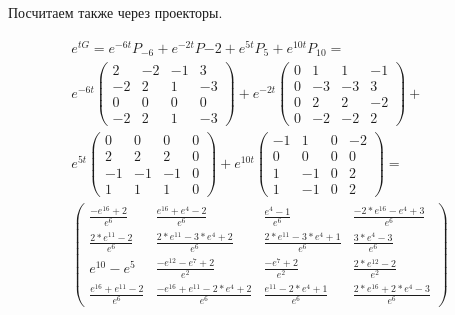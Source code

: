 \documentclass[12pt, a4paper]{article}
\begin{document}
    Посчитаем также через проекторы.

    \begin{multline}
        e^{t G} = e^{-6t} P_{-6} + e^{-2t} P{-2} + e^{5t} P_{5} + e^{10t} P_{10} = \\
        e^{-6t} \left(\begin{matrix}
            2 & -2 & -1 & 3 \\
            -2 & 2 & 1 & -3 \\
            0 & 0 & 0 & 0 \\
            -2 & 2 & 1 & -3
        \end{matrix}\right) + e^{-2t} \left(\begin{matrix}
            0 & 1 & 1 & -1 \\
            0 & -3 & -3 & 3 \\
            0 & 2 & 2 & -2 \\
            0 & -2 & -2 & 2
        \end{matrix}\right) + \\
         e^{5t} \left(\begin{matrix}
            0 & 0 & 0 & 0 \\
            2 & 2 & 2 & 0 \\
            -1 & -1 & -1 & 0 \\
            1 & 1 & 1 & 0
        \end{matrix}\right) + e^{10t} \left(\begin{matrix}
            -1 & 1 & 0 & -2 \\
            0 & 0 & 0 & 0 \\
            1 & -1 & 0 & 2 \\
            1 & -1 & 0 & 2
        \end{matrix}\right) = \\ \left(\begin{matrix}
            \frac{-e^{16}+2}{e^6} & \frac{e^{16}+e^4-2}{e^6} & \frac{e^4-1}{e^6} & \frac{-2*e^{16}-e^4+3}{e^6} \\
            \frac{2*e^{11}-2}{e^6} & \frac{2*e^{11}-3*e^4+2}{e^6} & \frac{2*e^{11}-3*e^4+1}{e^6} & \frac{3*e^4-3}{e^6} \\
            e^{10}-e^5 & \frac{-e^{12}-e^7+2}{e^2} & \frac{-e^7+2}{e^2} & \frac{2*e^{12}-2}{e^2} \\
            \frac{e^{16}+e^{11}-2}{e^6} & \frac{-e^{16}+e^{11}-2*e^4+2}{e^6} & \frac{e^{11}-2*e^4+1}{e^6} & \frac{2*e^{16}+2*e^4-3}{e^6}
        \end{matrix}\right)
    \end{multline}
\end{document}
